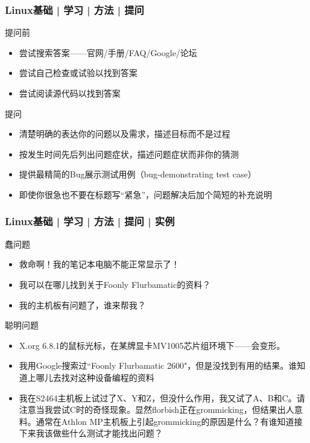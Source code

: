 \begin{frame}
  \frametitle{Linux基础 | 学习 | 方法 | 提问}
    \begin{block}{提问前}
      \begin{itemize}
        \item 尝试搜索答案——官网/手册/FAQ/Google/论坛
        \item 尝试自己检查或试验以找到答案
        \item 尝试阅读源代码以找到答案
      \end{itemize}
    \end{block}
    \pause
    \begin{block}{提问}
      \begin{itemize}
        \item 清楚明确的表达你的问题以及需求，描述目标而不是过程
        \item 按发生时间先后列出问题症状，描述问题症状而非你的猜测
        \item 提供最精简的Bug展示测试用例（bug-demonstrating test case）
        \item 即使你很急也不要在标题写“紧急”，问题解决后加个简短的补充说明
      \end{itemize}
    \end{block}
\end{frame}

\begin{frame}
  \frametitle{Linux基础 | 学习 | 方法 | 提问 | 实例}
  \begin{block}{蠢问题}
    \begin{itemize}
      \item 救命啊！我的笔记本电脑不能正常显示了！
      \item 我可以在哪儿找到关于Foonly Flurbamatic的资料？
      \item 我的主机板有问题了，谁来帮我？
    \end{itemize}
  \end{block}
  \pause
  \vspace{-0.5em}
  \begin{block}{聪明问题}
    \begin{itemize}
      \item X.org 6.8.1的鼠标光标，在某牌显卡MV1005芯片组环境下——会变形。
      \item 我用Google搜索过``Foonly Flurbamatic 2600"，但是没找到有用的结果。谁知道上哪儿去找对这种设备编程的资料
      \item 我在S2464主机板上试过了X、Y和Z，但没什么作用，我又试了A、B和C。请注意当我尝试C时的奇怪现象。显然florbish正在grommicking，但结果出人意料。通常在Athlon MP主机板上引起grommicking的原因是什么？有谁知道接下来我该做些什么测试才能找出问题？
    \end{itemize}
  \end{block}
\end{frame}

